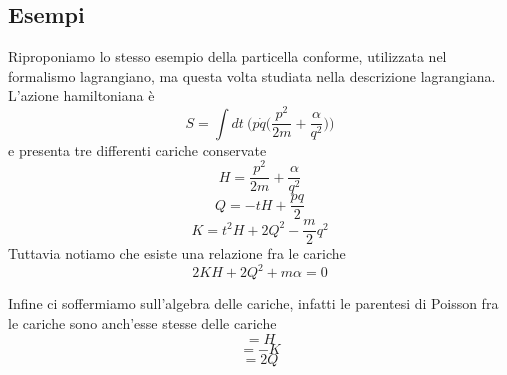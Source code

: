 \subsection{Esempi}
    Riproponiamo lo stesso esempio della particella conforme, utilizzata nel formalismo lagrangiano, ma questa volta studiata nella descrizione lagrangiana. L'azione hamiltoniana è 
\begin{equation}
    S = \int dt ~ \Big (p \dot q \Big( \frac{p^2}{2m} + \frac{\alpha}{q^2} \Big) \Big)
\end{equation}
    e presenta tre differenti cariche conservate 
\begin{equation}
    H = \frac{p^2}{2m} + \frac{\alpha}{q^2}
\end{equation}
\begin{equation}
    Q = -tH + \frac{pq}{2}
\end{equation}
\begin{equation}
    K = t^2H + 2Q^2 - \frac{m}{2} q^2
\end{equation}  
    Tuttavia notiamo che esiste una relazione fra le cariche 
\begin{equation}
    2KH + 2Q^2 + m\alpha = 0
\end{equation}

    Infine ci soffermiamo sull'algebra delle cariche, infatti le parentesi di Poisson fra le cariche sono anch'esse stesse delle cariche
\begin{equation}
    [Q, ~H] = H
\end{equation}
\begin{equation}
    [Q, ~K] = -K
\end{equation}
\begin{equation}
    [K, ~H] = 2Q
\end{equation}
